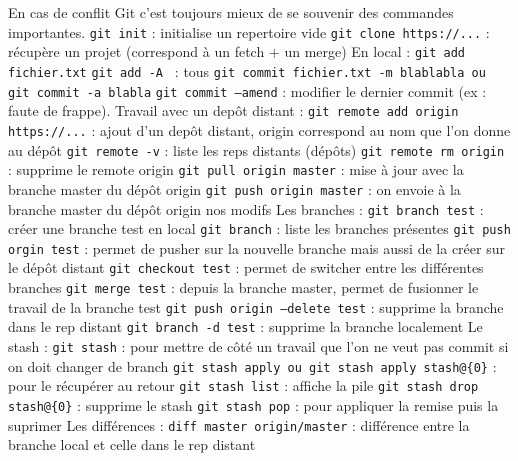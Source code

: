 \documentclass{article}
\begin{document}
    \noindent En cas de conflit Git c'est toujours mieux de se souvenir des commandes importantes. \bigbreak
    \noindent\texttt{git init} : initialise un repertoire vide \smallbreak
    \noindent\texttt{git clone https://...} : récupère un projet (correspond à un fetch + un merge) \bigbreak
    \noindent En local : \bigbreak
    \noindent\texttt{git add fichier.txt} \smallbreak
    \noindent\texttt{git add -A } : tous \smallbreak
    \noindent\texttt{git commit fichier.txt -m blablabla ou git commit -a blabla} \smallbreak
    \noindent\texttt{git commit --amend} : modifier le dernier commit (ex : faute de frappe). \bigbreak
    \noindent Travail avec un depôt distant : \bigbreak
    \noindent\texttt{git remote add origin https://...} : ajout d'un depôt distant, origin correspond au nom que l'on donne au dépôt \smallbreak
    \noindent\texttt{git remote -v} : liste les reps distants (dépôts) \smallbreak
    \noindent\texttt{git remote rm origin} : supprime le remote origin \smallbreak
    \noindent\texttt{git pull origin master} : mise à jour avec la branche master du dépôt origin \smallbreak
    \noindent\texttt{git push origin master} : on envoie à la branche master du dépôt origin nos modifs \bigbreak
    \noindent Les branches : \bigbreak
    \noindent\texttt{git branch test} : créer une branche test en local \smallbreak
    \noindent\texttt{git branch} : liste les branches présentes \smallbreak
    \noindent\texttt{git push orgin test} : permet de pusher sur la nouvelle branche mais aussi de la créer sur le dépôt distant \smallbreak
    \noindent\texttt{git checkout test} : permet de switcher entre les différentes branches \smallbreak
    \noindent\texttt{git merge test} : depuis la branche master, permet de fusionner le travail de la branche test \smallbreak
    \noindent\texttt{git push origin --delete test} : supprime la branche dans le rep distant \smallbreak
    \noindent\texttt{git branch -d test} : supprime la branche localement \bigbreak
    \noindent Le stash : \bigbreak
    \noindent\texttt{git stash} : pour mettre de côté un travail que l'on ne veut pas commit si on doit changer de branch \smallbreak
    \noindent\texttt{git stash apply ou git stash apply stash@\{0\}} : pour le récupérer au retour \smallbreak
    \noindent\texttt{git stash list} : affiche la pile \smallbreak
    \noindent\texttt{git stash drop stash@\{0\}} : supprime le stash \smallbreak
    \noindent\texttt{git stash pop} : pour appliquer la remise puis la suprimer \bigbreak
    \noindent Les différences : \bigbreak
    \noindent\texttt{diff master origin/master} : différence entre la branche local et celle dans le rep distant \bigbreak
\end{document}

